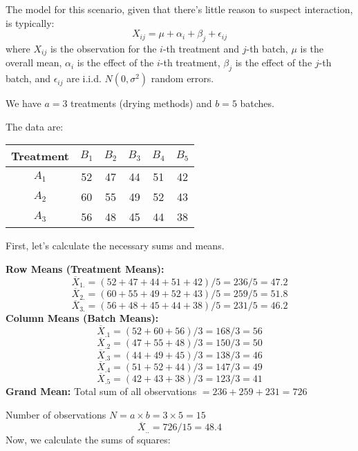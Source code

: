 The model for this scenario, given that there's little reason to suspect interaction, is typically:
\[
X_{ij} = \mu + \alpha_i + \beta_j + \epsilon_{ij}
\]
where $X_{ij}$ is the observation for the $i$-th treatment and $j$-th batch, $\mu$ is the overall mean, $\alpha_i$ is the effect of the $i$-th treatment, $\beta_j$ is the effect of the $j$-th batch, and $\epsilon_{ij}$ are i.i.d. $N(0, \sigma^2)$ random errors.

We have $a=3$ treatments (drying methods) and $b=5$ batches.

The data are:

\begin{table}[h]
	\centering
	\begin{tabular}{|c|c|c|c|c|c|}
		\hline
		Treatment & $B_1$ & $B_2$ & $B_3$ & $B_4$ & $B_5$ \\
		\hline
		$A_1$ & 52 & 47 & 44 & 51 & 42 \\
		\hline
		$A_2$ & 60 & 55 & 49 & 52 & 43 \\
		\hline
		$A_3$ & 56 & 48 & 45 & 44 & 38 \\
		\hline
	\end{tabular}
\end{table}
First, let's calculate the necessary sums and means.

\textbf{Row Means (Treatment Means):}
\[
\overline{X}_{1.} = (52+47+44+51+42) / 5 = 236 / 5 = 47.2
\]
\[
\overline{X}_{2.} = (60+55+49+52+43) / 5 = 259 / 5 = 51.8
\]
\[
\overline{X}_{3.} = (56+48+45+44+38) / 5 = 231 / 5 = 46.2
\]
\textbf{Column Means (Batch Means):}
\[
\overline{X}_{.1} = (52+60+56) / 3 = 168 / 3 = 56
\]
\[
\overline{X}_{.2} = (47+55+48) / 3 = 150 / 3 = 50
\]
\[
\overline{X}_{.3} = (44+49+45) / 3 = 138 / 3 = 46
\]
\[
\overline{X}_{.4} = (51+52+44) / 3 = 147 / 3 = 49
\]
\[
\overline{X}_{.5} = (42+43+38) / 3 = 123 / 3 = 41
\]
\textbf{Grand Mean:}
Total sum of all observations $= 236 + 259 + 231 = 726$

Number of observations $N = a \times b = 3 \times 5 = 15$
\[
\overline{X}_{..} = 726 / 15 = 48.4
\]
Now, we calculate the sums of squares:

